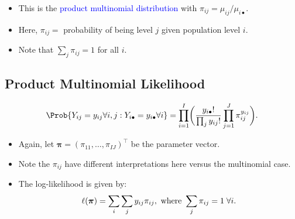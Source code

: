\documentclass{article}\usepackage[]{graphicx}\usepackage[svgnames]{xcolor}
\providecommand\given{} %
\renewcommand\given{\nonscript\:\delimsize\vert\nonscript\:\mathopen{}}%
\renewcommand\given{\nonscript\:\delimsize\vert\nonscript\:\mathopen{}}%
\renewcommand\given{\nonscript\:\delimsize\vert\nonscript\:\mathopen{}}%
\renewcommand\given{\nonscript\:\delimsize\vert\nonscript\:\mathopen{}}%
\renewcommand\given{\nonscript\:\delimsize\vert\nonscript\:\mathopen{}}%
\renewcommand\given{\nonscript\:\delimsize\vert\nonscript\:\mathopen{}}%
\renewcommand\given{\nonscript\:\delimsize\vert\nonscript\:\mathopen{}}%
\renewcommand\given{\nonscript\:\delimsize\vert\nonscript\:\mathopen{}}%
\let\log\relax%
\renewcommand\given{:}
\providecommand{\Vector}[1]{\bm{#1}}%
\begin{document}
\begin{itemize}
      \item This is the \textcolor{Blue}{product multinomial distribution} with $ \pi_{ij}=\mu_{ij}/\mu_{i\bullet} $.
      \item Here, $ \pi_{ij}= $ probability of being level $j$ given population level $i$.
      \item Note that $ \sum_j \pi_{ij}=1 $ for all $ i $.
\end{itemize}
\subsection*{Product Multinomial Likelihood}
\[ \Prob{Y_{ij}=y_{ij}\forall i,j\given Y_{i\bullet}=y_{i\bullet}\forall i}=
      \prod_{i=1}^I\biggl(\frac{y_{i\bullet}!}{\prod_j y_{ij}!}\prod_{j=1}^J \pi_{ij}^{y_{ij}}\biggr). \]
\begin{itemize}
      \item Again, let $ \Vector{\pi}=(\pi_{11},\ldots,\pi_{IJ})^\top $ be the parameter vector.
      \item Note the $ \pi_{ij} $ have different interpretations here versus the multinomial case.
      \item The log-likelihood is given by:
            \[ \ell(\Vector{\pi})=\sum_i\sum_j y_{ij}\log{\pi_{ij}},\text{ where }\sum_j \pi_{ij}=1\;\forall i. \]
\end{itemize}
\end{document}
